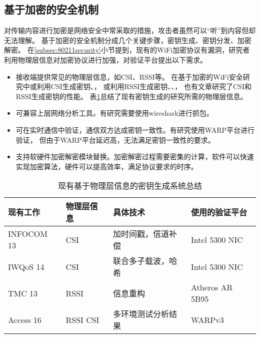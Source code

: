 		\subsection{基于加密的安全机制}\label{subsec:demand_encryption}
		对传输内容进行加密是网络安全中常采取的措施，攻击者虽然可以“听”到内容但却无法理解。
		基于加密的安全机制分成几个关键步骤，密钥生成、密钥分发、加密解密。
		在\ref{subsec:80211security}小节提到，现有的WiFi加密协议有漏洞，研究者利用物理层信息对加密协议进行加强，对验证平台提出以下需求。
		\begin{itemize}
			\item 接收端提供常见的物理层信息，如CSI、RSSI等。
			在基于加密的WiFi安全研究中或利用CSI生成密钥\cite{infocom13key}、\cite{iwqos14key}，
			或利用RSSI生成密钥\cite{mobicom08key}、\cite{mobicom09key}、\cite{tmc13key}，
			也有文章研究了CSI和RSSI生成密钥的性能\cite{access16key}。
			表\ref{tab:key_generation_summary}总结了现有密钥生成的研究所需的物理层信息。
			\item 可兼容上层网络分析工具。有研究需要使用wireshark进行抓包\cite{tmc13key}。
			\item 可在实时通信中验证，通信双方达成密钥一致性。有研究使用WARP平台进行验证\cite{access16key}，
			但由于WARP平台延迟高，无法满足密钥一致性的要求。
			\item 支持软硬件加密解密模块替换。加密解密过程需要密集的计算，软件可以快速实现加密算法，硬件可以提高效率，满足协议要求的时序。
		\end{itemize}
		\begin{table}[!hbp]
		\centering
		\caption{现有基于物理层信息的密钥生成系统总结}
		\label{tab:key_generation_summary}
			\begin{tabular}{|l|l|l|l|} \hline
			现有工作 & 物理层信息 & 具体技术 & 使用的验证平台 \\ \hline
			INFOCOM 13\cite{infocom13key} & CSI & 加时间戳，信道补偿 & Intel 5300 NIC \\ \hline
			IWQoS 14\cite{iwqos14key} & CSI & 联合多子载波，哈希 & Intel 5300 NIC \\ \hline
			TMC 13\cite{tmc13key} & RSSI & 信息重构 & Atheros AR 5B95 \\ \hline
			Access 16\cite{access16key} & RSSI CSI & 多环境测试分析结果 & WARPv3 \\ \hline
			\end{tabular}
		\end{table}

